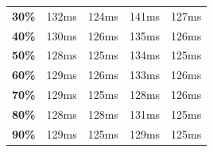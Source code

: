 \documentclass[draft,final]{vutinfth} %
\begin{document}
\begin{table}[]
\begin{tabular}{lrrrr}
\textbf{30\%}                                                                & 132ms                                                           & 124ms                                                           & 141ms                                                           & 127ms                                                           \\
\textbf{40\%}                                                                & 130ms                                                           & 126ms                                                           & 135ms                                                           & 126ms                                                           \\
\textbf{50\%}                                                                & 128ms                                                           & 125ms                                                           & 134ms                                                           & 125ms                                                           \\
\textbf{60\%}                                                                & 129ms                                                           & 126ms                                                           & 133ms                                                           & 126ms                                                           \\
\textbf{70\%}                                                                & 129ms                                                           & 125ms                                                           & 128ms                                                           & 126ms                                                           \\
\textbf{80\%}                                                                & 128ms                                                           & 128ms                                                           & 131ms                                                           & 125ms                                                           \\
\textbf{90\%}                                                                & 129ms                                                           & 125ms                                                           & 129ms                                                           & 125ms                                                           \\

\end{tabular}
\end{table}
\end{document}
